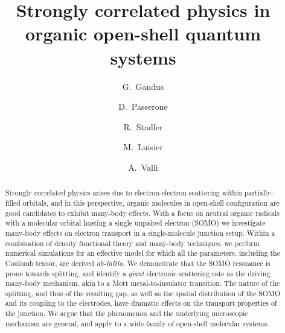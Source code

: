\documentclass[aps,prx,twocolumn,superscriptaddress]{revtex4-2}
\begin{document}
\title{Strongly correlated physics in organic open-shell quantum systems}

\author{G.~Gandus}
 \author{D.~Passerone}
 \author{R.~Stadler}
  \author{M.~Luisier}
\author{A.~Valli}



\begin{abstract} 
Strongly correlated physics arises due to electron-electron scattering within partially-filled orbitals, 
and in this perspective, organic molecules in open-shell configuration are good candidates to exhibit many-body effects. 
With a focus on neutral organic radicals with a molecular orbital hosting a single unpaired electron (SOMO) 
we investigate many-body effects on electron transport in a single-molecule junction setup. 
Within a combination of density functional theory and many-body techniques, we perform numerical simulations for an effective model for which all the parameters, including the Coulomb tensor, are derived \emph{ab-initio}.  
We demonstrate that the SOMO resonance is prone towards splitting, and identify a \emph{giant} electronic scattering rate as the driving many-body mechanism, akin to a Mott metal-to-insulator transition. 
The nature of the splitting, and thus of the resulting gap, as well as the spatial distribution of the SOMO and its coupling to the electrodes, have dramatic effects on the transport properties of the junction. 
We argue that the phenomenon and the underlying microscopic mechanism are general, 
and apply to a wide family of open-shell molecular systems. 
\end{abstract}

\maketitle
\end{document}
